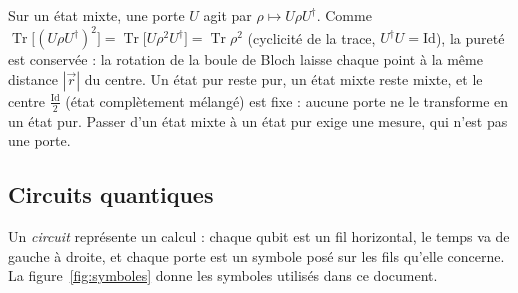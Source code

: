 \begin{remarque}\label{rem:purete}
Sur un état mixte, une porte $U$ agit par $\rho\mapsto U\rho U^\dagger$. Comme
$\operatorname{Tr}\big[(U\rho U^\dagger)^2\big]=\operatorname{Tr}\big[U\rho^2U^\dagger\big]=\operatorname{Tr}\rho^2$
(cyclicité de la trace, $U^\dagger U=\mathrm{Id}$), la pureté est conservée : la rotation de la boule de
Bloch laisse chaque point à la même distance $|\vec r|$ du centre. Un état pur reste pur, un état
mixte reste mixte, et le centre $\frac{\mathrm{Id}}{2}$ (état complètement mélangé) est fixe : aucune
porte ne le transforme en un état pur. Passer d'un état mixte à un état pur exige une mesure, qui
n'est pas une porte.
\end{remarque}

\subsection{Circuits quantiques}\label{sec:circuits}

Un \emph{circuit} représente un calcul : chaque qubit est un fil horizontal, le temps va de gauche
à droite, et chaque porte est un symbole posé sur les fils qu'elle concerne. La
figure~\ref{fig:symboles} donne les symboles utilisés dans ce document.

